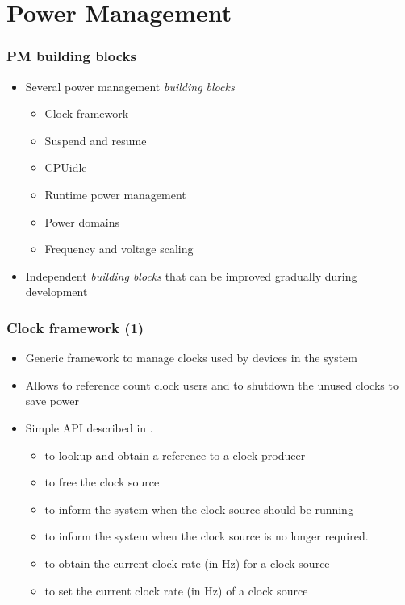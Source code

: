 \section{Power Management}

\begin{frame}
  \frametitle{PM building blocks}
  \begin{itemize}
  \item Several power management \emph{building blocks}
    \begin{itemize}
    \item Clock framework
    \item Suspend and resume
    \item CPUidle
    \item Runtime power management
    \item Power domains
    \item Frequency and voltage scaling
    \end{itemize}
  \item Independent \emph{building blocks} that can be improved
    gradually during development
  \end{itemize}
\end{frame}

\begin{frame}
  \frametitle{Clock framework (1)}
  \begin{itemize}
  \item Generic framework to manage clocks used by devices in the
    system
  \item Allows to reference count clock users and to shutdown the
    unused clocks to save power
  \item Simple API described in .
    \begin{itemize}
    \item {} to lookup and obtain a reference to a clock producer
    \item {} to free the clock source
    \item {} to inform the system when the clock source should be running
    \item {} to inform the system when the clock source is no longer required.
    \item {} to obtain the current clock rate (in Hz) for a clock source
    \item {} to set the current clock rate (in Hz) of a clock source
    \end{itemize}
  \end{itemize}
\end{frame}


